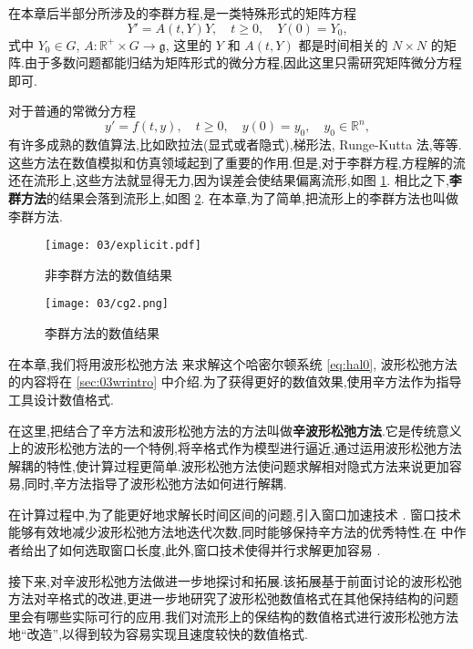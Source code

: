在本章后半部分所涉及的李群方程,是一类特殊形式的矩阵方程
\begin{equation*}
	Y'=A(t,Y)Y,\quad t\geq 0,\quad Y(0)=Y_0,
\end{equation*}
式中 $Y_0\in G $, $A:\mathbb{R}^+\times G\to \mathfrak{g}$, 这里的 $Y$ 和 $A(t,Y)$ 都是时间相关的 $N\times N$ 的矩阵.由于多数问题都能归结为矩阵形式的微分方程,因此这里只需研究矩阵微分方程即可.

对于普通的常微分方程
\begin{equation*}
	y'=f(t,y),\quad t\geq 0,\quad y(0)=y_0,\quad y_0 \in \mathbb{R}^n,
\end{equation*}
有许多成熟的数值算法,比如欧拉法(显式或者隐式),梯形法, Runge-Kutta 法,等等.这些方法在数值模拟和仿真领域起到了重要的作用.但是,对于李群方程,方程解的流还在流形上,这些方法就显得无力,因为误差会使结果偏离流形,如图 \ref{fig:explicit}. 相比之下,\textbf{李群方法}的结果会落到流形上,如图 \ref{fig:midpoint}. 在本章,为了简单,把流形上的李群方法也叫做李群方法.

\begin{figure}[h!]
  \centering
  \texttt{[image: 03/explicit.pdf]}
  \caption{非李群方法的数值结果}
  \label{fig:explicit}
\end{figure}

\begin{figure}[h!]
  \centering
  \texttt{[image: 03/cg2.png]}
  \caption{李群方法的数值结果}
  \label{fig:midpoint}
\end{figure}

在本章,我们将用波形松弛方法 \cite{jiang2009wr} 来求解这个哈密尔顿系统 \eqref{eq:hal0}, 波形松弛方法的内容将在 \ref{sec:03wrintro} 中介绍.为了获得更好的数值效果,使用辛方法作为指导工具设计数值格式.

在这里,把结合了辛方法和波形松弛方法的方法叫做\textbf{辛波形松弛方法}.它是传统意义上的波形松弛方法的一个特例,将辛格式作为模型进行逼近,通过运用波形松弛方法解耦的特性,使计算过程更简单.波形松弛方法使问题求解相对隐式方法来说更加容易,同时,辛方法指导了波形松弛方法如何进行解耦.

在计算过程中,为了能更好地求解长时间区间的问题,引入窗口加速技术 \cite{jiang2006windowing,ladics2015error}. 窗口技术能够有效地减少波形松弛方法地迭代次数,同时能够保持辛方法的优秀特性.在 \cite{jiang2006windowing} 中作者给出了如何选取窗口长度,此外,窗口技术使得并行求解更加容易 \cite{liu2011waveform}.

接下来,对辛波形松弛方法做进一步地探讨和拓展.该拓展基于前面讨论的波形松弛方法对辛格式的改进,更进一步地研究了波形松弛数值格式在其他保持结构的问题里会有哪些实际可行的应用.我们对流形上的保结构的数值格式进行波形松弛方法地``改造'',以得到较为容易实现且速度较快的数值格式.

